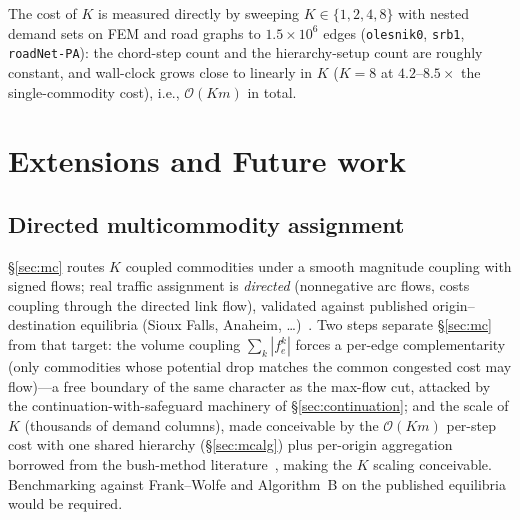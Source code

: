 \documentclass{siamart220329}
\begin{document}
The cost of $K$ is measured directly by sweeping $K\in\{1,2,4,8\}$ with nested demand sets on FEM and
road graphs to $1.5\times10^6$ edges (\texttt{olesnik0}, \texttt{srb1}, \texttt{roadNet-PA}): the
chord-step count and the hierarchy-setup count are roughly constant, and wall-clock grows close to linearly in $K$ ($K{=}8$ at $4.2$--$8.5\times$ the single-commodity cost), i.e., $\mathcal{O}(Km)$ in total.

\section{Extensions and Future work}\label{sec:extensions}

\subsection{Directed multicommodity assignment}\label{sec:multicommodity}
\S\ref{sec:mc} routes $K$ coupled commodities under a smooth magnitude coupling with signed flows;
real traffic assignment is \emph{directed} (nonnegative arc flows, costs coupling through the directed
link flow), validated against published origin--destination equilibria (Sioux Falls, Anaheim, \dots)~\cite{tntp,bargera2002}.
Two steps separate \S\ref{sec:mc} from that target: the volume coupling $\sum_k|f^k_e|$ forces a
per-edge complementarity (only commodities whose potential drop matches the common congested cost may
flow)---a free boundary of the same character as the max-flow cut, attacked by the
continuation-with-safeguard machinery of \S\ref{sec:continuation}; and the scale of $K$ (thousands of
demand columns), made conceivable by the $\mathcal{O}(Km)$ per-step cost with one shared hierarchy
(\S\ref{sec:mcalg}) plus per-origin aggregation borrowed from the bush-method literature~\cite{bargera2002,bargera2010}, making the $K$ scaling conceivable. Benchmarking against Frank--Wolfe and
Algorithm~B on the published equilibria would be required.
\end{document}
